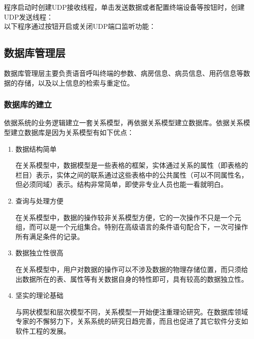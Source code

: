 程序启动时创建UDP接收线程，单击发送数据或者配置终端设备等按钮时，创建UDP发送线程：\\


以下程序通过按钮开启或关闭UDP端口监听功能：\\


\subsection{数据库管理层}
数据库管理层主要负责语音呼叫终端的参数、病房信息、病员信息、用药信息等数据的存储，以及以上信息的检索与重定位。

\subsubsection{数据库的建立}
依据系统的业务逻辑建立一套关系模型，再依据关系模型建立数据库。依据关系模型建立数据库是因为关系模型有如下优点：
\begin{enumerate}
\item 数据结构简单

在关系模型中，数据模型是一些表格的框架，实体通过关系的属性（即表格的栏目）表示，实体之间的联系通过这些表格中的公共属性（可以不同属性名，但必须同域）表示。结构非常简单，即使非专业人员也能一看就明白。
\item 查询与处理方便

在关系模型中，数据的操作较非关系模型方便，它的一次操作不只是一个元组，而可以是一个元组集合。特别在高级语言的条件语句配合下，一次可操作所有满足条件的记录。
\item 数据独立性很高

在关系模型中，用户对数据的操作可以不涉及数据的物理存储位置，而只须给出数据所在的表、属性等有关数据自身的特性即可，具有较高的数据独立性。
\item 坚实的理论基础

与网状模型和层次模型不同，关系模型一开始便注重理论研究。在数据库领域专家的不懈努力下，关系系统的研究日趋完善，而且也促进了其它软件分支如软件工程的发展。
\end{enumerate}

